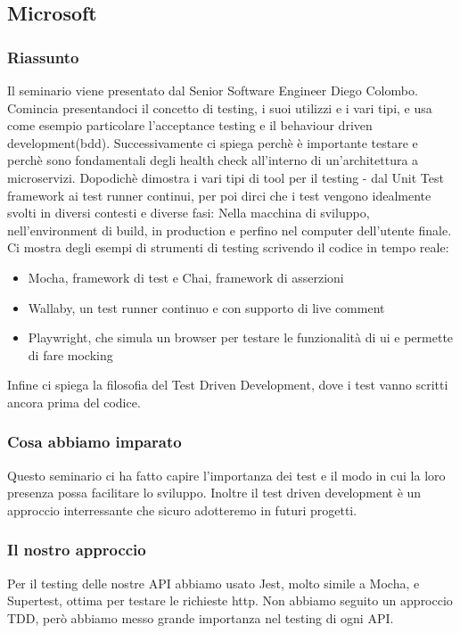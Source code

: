 \documentclass{report}
\begin{document}
\subsection{Microsoft}
\subsubsection*{Riassunto}
Il seminario viene presentato dal Senior Software Engineer Diego Colombo.
Comincia presentandoci il concetto di testing, i suoi utilizzi e i vari tipi, e usa come esempio particolare l'acceptance testing e il behaviour driven development(bdd).
Successivamente ci spiega perchè è importante testare e perchè sono fondamentali degli health check all'interno di un'architettura a microservizi.
Dopodichè dimostra i vari tipi di tool per il testing - dal Unit Test framework ai test runner continui, 
per poi dirci che i test vengono idealmente svolti in diversi contesti e diverse fasi: Nella macchina di sviluppo, nell'environment di build, in production e perfino nel computer dell'utente finale.
Ci mostra degli esempi di strumenti di testing scrivendo il codice in tempo reale:
\begin{itemize}
	\item Mocha, framework di test e Chai, framework di asserzioni 
	\item Wallaby, un test runner continuo e con supporto di live comment
	\item Playwright, che simula un browser per testare le funzionalità di ui e permette di fare mocking
\end{itemize}
Infine ci spiega la filosofia del Test Driven Development, dove i test vanno scritti ancora prima del codice.
\subsubsection*{Cosa abbiamo imparato}
Questo seminario ci ha fatto capire l'importanza dei test e il modo in cui la loro presenza possa facilitare lo sviluppo. Inoltre il test driven development è un approccio interressante che sicuro adotteremo in futuri progetti. 
\subsubsection*{Il nostro approccio}
Per il testing delle nostre API abbiamo usato Jest, molto simile a Mocha, e Supertest, ottima per testare le richieste http. Non abbiamo seguito un approccio TDD, però abbiamo messo grande importanza nel testing di ogni API.
\end{document}
